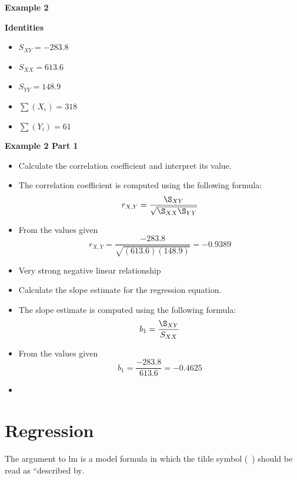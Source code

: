 \documentclass[]{report}
\begin{document}
\noindent \textbf{Example 2}





\noindent \textbf{Identities}
\begin{itemize}
	\item $S_{XY} = -283.8$
	\item $S_{XX} = 613.6$
	\item $S_{YY} = 148.9$
	\item $\sum(X_i)  = 318 $
	\item $\sum(Y_i)  = 61$
\end{itemize}


\noindent \textbf{Example 2 Part 1}

\begin{itemize}
	\item Calculate the correlation coefficient and interpret its value.
	\item The correlation coefficient is computed using the following formula:
	\[ r_{X,Y} = \frac{\S_{XY}}{\sqrt{\S_{XX}\S_{YY}}} \]
	\item From the values given
	\[ r_{X,Y} = \frac{-283.8}{\sqrt{(613.6)(148.9)}} = -0.9389 \]
	\item Very strong negative linear relationship
	
	\item Calculate the slope estimate for the regression equation.
	\item The slope estimate is computed using the following formula:
	\[ b_1 = \frac{\S_{XY}}{S_{XX}} \]
	\item From the values given
	\[ b_1 = \frac{-283.8}{613.6} =-0.4625 \]
	\item 
\end{itemize}






\section{Regression}

The argument to lm is a model formula in which the tilde symbol
(~) should be read as ``described by.
\end{document}
